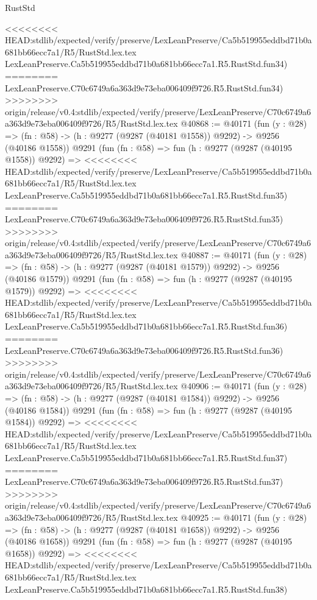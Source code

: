 \begin{lexlean}{RustStd}
\begin{coremodule}
{\begin{coremodule}
{{{{{{{{{{{{{{{{{{{{{{{{{{{{{{{{{{{{{{{{{{{{{{{{{{{{{{{<<<<<<<< HEAD:stdlib/expected/verify/preserve/LexLeanPreserve/Ca5b519955eddbd71b0a681bb66ecc7a1/R5/RustStd.lex.tex
    LexLeanPreserve.Ca5b519955eddbd71b0a681bb66ecc7a1.R5.RustStd.fun34)
========
    LexLeanPreserve.C70c6749a6a363d9e73eba006409f9726.R5.RustStd.fun34)
>>>>>>>> origin/release/v0.4:stdlib/expected/verify/preserve/LexLeanPreserve/C70c6749a6a363d9e73eba006409f9726/R5/RustStd.lex.tex
@40868 := @40171
    (fun (y : @28) =>
    (fn : @58) -> (h : @9277 (@9287 (@40181 @1558)) @9292) -> @9256 (@40186 @1558))
    @9291
    (fun (fn : @58) =>
    fun (h : @9277 (@9287 (@40195 @1558)) @9292) =>
<<<<<<<< HEAD:stdlib/expected/verify/preserve/LexLeanPreserve/Ca5b519955eddbd71b0a681bb66ecc7a1/R5/RustStd.lex.tex
    LexLeanPreserve.Ca5b519955eddbd71b0a681bb66ecc7a1.R5.RustStd.fun35)
========
    LexLeanPreserve.C70c6749a6a363d9e73eba006409f9726.R5.RustStd.fun35)
>>>>>>>> origin/release/v0.4:stdlib/expected/verify/preserve/LexLeanPreserve/C70c6749a6a363d9e73eba006409f9726/R5/RustStd.lex.tex
@40887 := @40171
    (fun (y : @28) =>
    (fn : @58) -> (h : @9277 (@9287 (@40181 @1579)) @9292) -> @9256 (@40186 @1579))
    @9291
    (fun (fn : @58) =>
    fun (h : @9277 (@9287 (@40195 @1579)) @9292) =>
<<<<<<<< HEAD:stdlib/expected/verify/preserve/LexLeanPreserve/Ca5b519955eddbd71b0a681bb66ecc7a1/R5/RustStd.lex.tex
    LexLeanPreserve.Ca5b519955eddbd71b0a681bb66ecc7a1.R5.RustStd.fun36)
========
    LexLeanPreserve.C70c6749a6a363d9e73eba006409f9726.R5.RustStd.fun36)
>>>>>>>> origin/release/v0.4:stdlib/expected/verify/preserve/LexLeanPreserve/C70c6749a6a363d9e73eba006409f9726/R5/RustStd.lex.tex
@40906 := @40171
    (fun (y : @28) =>
    (fn : @58) -> (h : @9277 (@9287 (@40181 @1584)) @9292) -> @9256 (@40186 @1584))
    @9291
    (fun (fn : @58) =>
    fun (h : @9277 (@9287 (@40195 @1584)) @9292) =>
<<<<<<<< HEAD:stdlib/expected/verify/preserve/LexLeanPreserve/Ca5b519955eddbd71b0a681bb66ecc7a1/R5/RustStd.lex.tex
    LexLeanPreserve.Ca5b519955eddbd71b0a681bb66ecc7a1.R5.RustStd.fun37)
========
    LexLeanPreserve.C70c6749a6a363d9e73eba006409f9726.R5.RustStd.fun37)
>>>>>>>> origin/release/v0.4:stdlib/expected/verify/preserve/LexLeanPreserve/C70c6749a6a363d9e73eba006409f9726/R5/RustStd.lex.tex
@40925 := @40171
    (fun (y : @28) =>
    (fn : @58) -> (h : @9277 (@9287 (@40181 @1658)) @9292) -> @9256 (@40186 @1658))
    @9291
    (fun (fn : @58) =>
    fun (h : @9277 (@9287 (@40195 @1658)) @9292) =>
<<<<<<<< HEAD:stdlib/expected/verify/preserve/LexLeanPreserve/Ca5b519955eddbd71b0a681bb66ecc7a1/R5/RustStd.lex.tex
    LexLeanPreserve.Ca5b519955eddbd71b0a681bb66ecc7a1.R5.RustStd.fun38)
}}}}}}}}}}}}}}}}}}}}}}}}}}}}}}}}}}}}}}}}}}}}}}}}}}}}}}}
\end{coremodule}}
\end{coremodule}
\end{lexlean}
